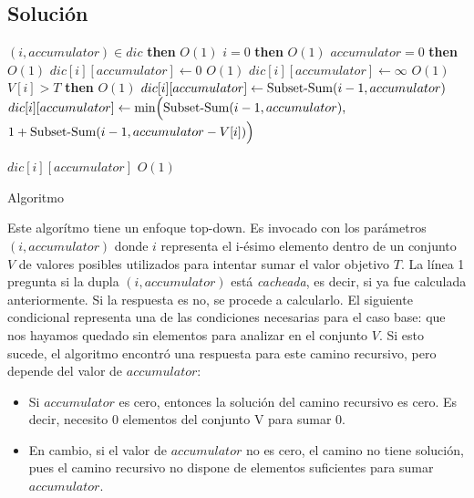 \subsection{Solución}
\begin{center}
	\begin{minipage}{.8\textwidth}
		\begin{codebox}
				\li \If $(i, accumulator) \in dic$ \textbf{then}				\RComment $O(1)$
				\li \Then
					\If $i = 0$ \textbf{then}									\RComment $O(1)$
					\li \Then
						\If $accumulator = 0$ \textbf{then}						\RComment $O(1)$
						\li \Then
							 $dic[i][accumulator] \leftarrow 0$ 				\RComment $O(1)$
						\li \Else
							\li $dic[i][accumulator] \leftarrow \infty$ 		\RComment $O(1)$
							\li
						\End
					\Else
						\li \If $V[i] > T$ \textbf{then}						\RComment $O(1)$
						\li \Then
							 $dic[i][accumulator] \leftarrow \func{Subset-Sum}(i - 1, accumulator)$
						\li \Else
							\li $dic[i][accumulator] \leftarrow \func{min}\Big(\func{Subset-Sum}(i - 1, accumulator),$
							\Indentmore \li $1 + \func{Subset-Sum}(i - 1, accumulator - V[i])\Big)$
						\End
					\End
				\End

				\zi
				\li \Return $dic[i][accumulator]$								\RComment $O(1)$
			\End
		\end{codebox}

		\footnotesize Algoritmo
		\label{fig:algoritmo}
	\end{minipage}
\end{center}
Este algorítmo tiene un enfoque top-down. Es invocado con los parámetros $(i, accumulator)$ donde $i$ representa el i-ésimo elemento dentro de un conjunto $V$ de valores posibles utilizados para intentar sumar el valor objetivo $T$. La línea 1 pregunta si la dupla $(i, accumulator)$ está \textit{cacheada}, es decir, si ya fue calculada anteriormente. Si la respuesta es no, se procede a calcularlo. El siguiente condicional representa una de las condiciones necesarias para el caso base: que nos hayamos quedado sin elementos para analizar en el conjunto $V$. Si esto sucede, el algoritmo encontró una respuesta para este camino recursivo, pero depende del valor de $accumulator$:

\begin{itemize}
	\item Si $accumulator$ es cero, entonces la solución del camino recursivo es cero. Es decir, necesito 0 elementos del conjunto V para sumar 0.
	\item En cambio, si el valor de $accumulator$ no es cero, el camino no tiene solución, pues el camino recursivo no dispone de elementos suficientes para sumar $accumulator$.
\end{itemize}

